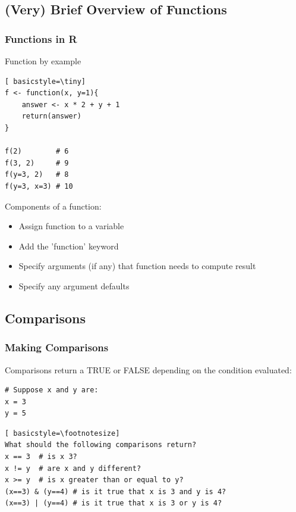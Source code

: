 \subsection{(Very) Brief Overview of Functions}
\begin{frame}[fragile]
	\frametitle{Functions in R}
	\vspace{-15pt}
	\begin{center}
		\begin{block}{Function by example}
			\begin{lstlisting}[ basicstyle=\tiny]
f <- function(x, y=1){
	answer <- x * 2 + y + 1
	return(answer)
}

f(2)        # 6
f(3, 2)     # 9
f(y=3, 2)   # 8
f(y=3, x=3) # 10
			\end{lstlisting}	
		\end{block}

		\vspace{-5pt}
		\begin{block}{Components of a function:}
			\begin{itemize}
				\item Assign function to a variable
				\item Add the 'function' keyword
				\item Specify arguments (if any) that function needs to compute result
				\item Specify any argument defaults
			\end{itemize}
		\end{block}
	\end{center} 
\end{frame}

\subsection{Comparisons}
\begin{frame}[fragile]
\frametitle{Making Comparisons}
Comparisons return a TRUE or FALSE depending on the condition evaluated:
			\begin{lstlisting}
# Suppose x and y are:
x = 3
y = 5
			\end{lstlisting}
			\begin{lstlisting}[ basicstyle=\footnotesize]
What should the following comparisons return?
x == 3  # is x 3?
x != y  # are x and y different?
x >= y  # is x greater than or equal to y?
(x==3) & (y==4) # is it true that x is 3 and y is 4?
(x==3) | (y==4) # is it true that x is 3 or y is 4?
			\end{lstlisting}	
\end{frame}



